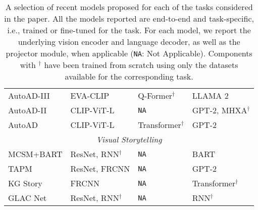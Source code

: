 \begin{table}[htbp]
\begin{tabularx}{\textwidth}{llll}
          AutoAD-III \cite{maad3} & EVA-CLIP & Q-Former$^\dag$ & {LLAMA 2} \\
          AutoAD-II \cite{maad2} & {CLIP-ViT-L} & \texttt{NA} & {GPT-2, MHXA$^\dag$} \\
          AutoAD \cite{maad1} & CLIP-ViT-L & {Transformer$^\dag$} & {GPT-2} \\
        \midrule
          \multicolumn{4}{c}{\textit{Visual Storytelling}} \\
        \midrule
          MCSM+BART \cite{vist_kg1} & ResNet, RNN$^\dag$ & \texttt{NA} & {BART} \\
          TAPM \cite{vist_tapm} & ResNet, FRCNN & \texttt{NA} & {GPT-2} \\
          KG Story \cite{vist_kg2} & FRCNN & \texttt{NA} & Transformer$^\dag$ \\
          GLAC Net \cite{vist_glacnet} & ResNet, RNN$^\dag$ & \texttt{NA} & RNN$^\dag$ \\
        \bottomrule
    \end{tabularx}
  \caption{A selection of recent models proposed for each of the tasks considered in the paper. All the models reported are end-to-end and task-specific, i.e., trained or fine-tuned for the task. For each model, we report the underlying vision encoder and language decoder, as well as the projector module, when applicable (\texttt{NA}: Not Applicable). Components with $^\dag$ have been trained from scratch using only the datasets available for the corresponding task.}
  \label{tab:models}
\end{table}
